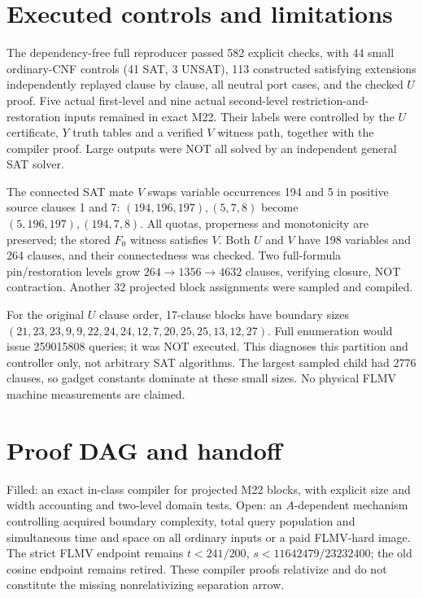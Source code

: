 \documentclass[11pt]{article}
\begin{document}
\section{Executed controls and limitations}
The dependency-free full reproducer passed 582 explicit checks, with 44
small ordinary-CNF controls (41 SAT, 3 UNSAT), 113 constructed satisfying
extensions independently replayed clause by clause, all neutral port cases,
and the checked \(U\) proof. Five actual first-level and nine actual
second-level restriction-and-restoration inputs remained in exact M22.
Their labels were controlled by the \(U\) certificate, \(Y\) truth tables and
a verified \(V\) witness path, together with the compiler proof. Large
outputs were NOT all solved by an independent general SAT solver.

The connected SAT mate \(V\) swaps variable occurrences 194 and 5 in positive
source clauses 1 and 7: \((194,196,197),(5,7,8)\) become
\((5,196,197),(194,7,8)\). All quotas, properness and monotonicity are
preserved; the stored \(F_0\) witness satisfies \(V\). Both \(U\) and \(V\)
have 198 variables and 264 clauses, and their connectedness was checked.
Two full-formula pin/restoration levels grow \(264\to1356\to4632\) clauses,
verifying closure, NOT contraction. Another 32 projected block assignments
were sampled and compiled.

For the original \(U\) clause order, 17-clause blocks have boundary sizes
\((21,23,23,9,9,22,24,24,12,7,20,25,25,13,12,27)\).
Full enumeration would issue 259015808 queries; it was NOT executed.
This diagnoses this partition and controller only, not arbitrary SAT
algorithms. The largest sampled child had 2776 clauses, so gadget constants
dominate at these small sizes. No physical FLMV machine measurements are
claimed.

\section{Proof DAG and handoff}
Filled: an exact in-class compiler for projected M22 blocks, with explicit
size and width accounting and two-level domain tests. Open: an
\(A\)-dependent mechanism controlling acquired boundary complexity, total
query population and simultaneous time and space on all ordinary inputs
or a paid FLMV-hard image. The strict FLMV endpoint remains
\(t<241/200\), \(s<11642479/23232400\); the old cosine endpoint remains
retired. These compiler proofs relativize and do not constitute the missing
nonrelativizing separation arrow.
\end{document}
